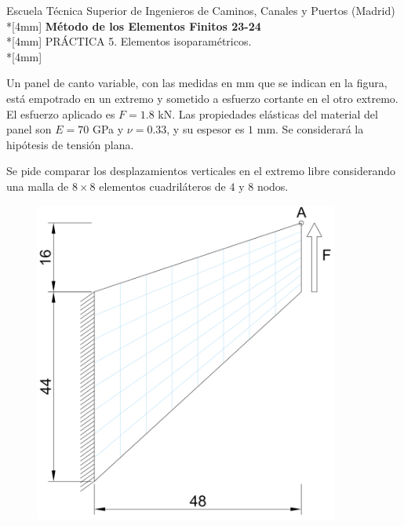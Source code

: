 \documentclass[a4paper,12pt]{article}
\begin{document}
\def\bm#1{{\mbox{\boldmath $#1$}}}
\def\eqdef{\buildrel \rm def \over =}
\def\signo{\mathop{\rm signo}\nolimits}

\mbox{}\vspace*{-20mm}

{\centering
{\small\sc Escuela Técnica Superior de Ingenieros de Caminos, Canales y Puertos (Madrid)}\\*[4mm]
{\Large\bf Método de los Elementos Finitos 23-24}\\*[4mm]
PRÁCTICA 5. Elementos isoparamétricos. \\*[4mm]
}



Un panel de canto variable, con las medidas en mm que se indican en la figura,
está empotrado en un extremo y sometido a esfuerzo cortante en el otro
extremo. El esfuerzo aplicado es $F=1.8$ kN. Las propiedades elásticas del material del panel son $E=70$ GPa y $\nu=0.33$, y su espesor es $1$ mm.
Se considerará la hipótesis de tensión plana.

Se pide comparar los desplazamientos verticales en el extremo libre
considerando una malla de $8 \times 8$ elementos cuadriláteros de $4$
y $8$ nodos.

\vspace{4mm}
\begin{figure}[h]
\includegraphics[width=10cm]{membrana8x8.png}
\centering
\end{figure}
\end{document}
